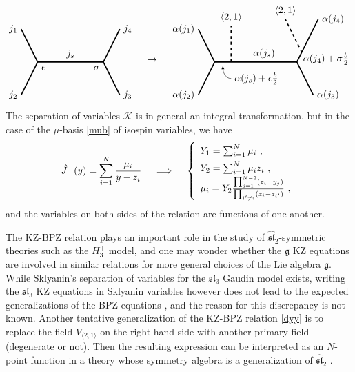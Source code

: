 \documentclass[12pt, a4paper, notitlepage, twoside]{report}
\numberwithin{equation}{section}
\theoremstyle{break}
\begin{document}
\begin{align}
\begin{tikzpicture}[baseline={(0,0)}, very thick, scale = .6]
\draw (-1,2) node [left] {$j_1$} -- (0,0) node[below right] {$\epsilon$} -- node [above] {$j_s$} (4,0) node[below left] {$\sigma$} -- (5,2) node [right] {$j_4$};
\draw (-1,-2) node [left] {$j_2$} -- (0,0);
\draw (4,0) -- (5,-2) node [right] {$j_3$};
\end{tikzpicture}
\quad \rightarrow \quad  
\begin{tikzpicture}[baseline={(0,0)}, very thick, scale = .6]
\draw (-1,2) node [left] {$\alpha(j_1)$} -- (0,0) -- (1,0) -- node [above] {$\alpha(j_s)$} (5,0) -- (6.3,2.6) node [right] {$\alpha(j_4)$};
\draw (-1,-2) node [left] {$\alpha(j_2)$} -- (0,0);
\draw (5,0) -- (6,-2) node [right] {$\alpha(j_3)$};
\draw[dashed] (1,0) -- (1,2.2) node[above] {$\left<2,1\right>$};
\draw[dashed] (5.3, .6) -- (4.3, 2.6) node[above] {$\left<2,1\right>$};
\node[right] at (5.15, .2) {$\alpha(j_4)+\sigma \frac{b}{2}$};
\draw[thin, latex-] (.5, -.2) to[out = -90, in = 180] (1,-1) node [right] {$\alpha(j_s) + \epsilon \frac{b}{2}$};
\end{tikzpicture}
\end{align}
The separation of variables $\mathcal{K}$ is in general an integral transformation, but in the case of the $\mu$-basis \eqref{mub} of isospin variables, we have 
\begin{align}
\renewcommand{\arraystretch}{1.5}
 \hat{J}^-(y) = \sum_{i=1}^N \frac{\mu_i}{y-z_i} \quad \implies \quad \left\{\begin{array}{l}  Y_1 =\sum_{i=1}^N \mu_i\ , \\ Y_2 = \sum_{i=1}^N \mu_i z_i\ , \\ \mu_i = Y_2\frac{\prod_{j=1}^{N-2}(z_i-y_j)}{\prod_{i'\neq i}(z_i-z_{i'})}\ ,\end{array}\right. 
\label{my}
\end{align}
and the variables on both sides of the relation are functions of one another. 

The KZ-BPZ relation plays an important role in the study of $\widehat{\mathfrak{sl}}_2$-symmetric theories such as the $H_3^+$ model, and one may wonder whether the $\mathfrak{g}$ KZ equations are involved in similar relations for more general choices of the Lie algebra $\mathfrak{g}$.
While Sklyanin's separation of variables for the $\mathfrak{sl}_3$ Gaudin model exists, writing the $\mathfrak{sl}_3$ KZ equations in Sklyanin variables however does not lead to the expected generalizations of the BPZ equations \cite{rib08b}, and the reason for this discrepancy is not known. 
Another tentative generalization of the KZ-BPZ relation \eqref{dyy} is to replace the field $V_{\langle 2,1\rangle}$ on the right-hand side with another primary field (degenerate or not).
Then the resulting expression can be interpreted as an $N$-point function in a theory whose symmetry algebra is a generalization of $\widehat{\mathfrak{sl}}_2$ \cite{rib08}.
\end{document}
